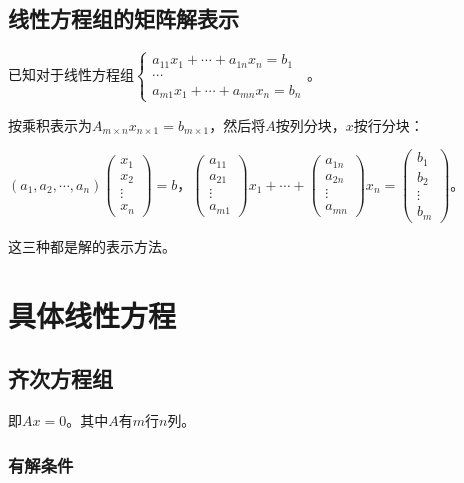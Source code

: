 \subsection{线性方程组的矩阵解表示}

已知对于线性方程组$\begin{cases}
    a_{11}x_1+\cdots+a_{1n}x_n=b_1 \\
    \cdots \\
    a_{m1}x_1+\cdots+a_{mn}x_n=b_n
\end{cases}$。

按乘积表示为$A_{m\times n}x_{n\times 1}=b_{m\times 1}$，然后将$A$按列分块，$x$按行分块：\medskip

$(a_1,a_2,\cdots,a_n)\left(\begin{array}{c}
    x_1 \\
    x_2 \\
    \vdots \\
    x_n
\end{array}\right)=b\text{，}\left(\begin{array}{c}
    a_{11} \\
    a_{21} \\
    \vdots \\
    a_{m1}
\end{array}\right)x_1+\cdots+\left(\begin{array}{c}
    a_{1n} \\
    a_{2n} \\
    \vdots \\
    a_{mn}
\end{array}\right)x_n=\left(\begin{array}{c}
    b_1 \\
    b_2 \\
    \vdots \\
    b_m
\end{array}\right)\text{。}$

这三种都是解的表示方法。

\section{具体线性方程}

\subsection{齐次方程组}

即$Ax=0$。其中$A$有$m$行$n$列。

\subsubsection{有解条件}

